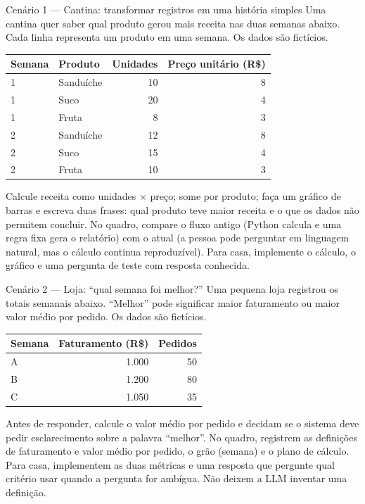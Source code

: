 \documentclass[10pt,a4paper]{article}
\begin{document}
\begin{cenario}{Cenário 1 --- Cantina: transformar registros em uma história simples}
Uma cantina quer saber qual produto gerou mais receita nas duas semanas abaixo. Cada linha representa um produto em uma semana. Os dados são fictícios.

\begin{center}\small
\begin{tabular}{l l r r}\toprule
Semana & Produto & Unidades & Preço unitário (R\$) \\\midrule
1 & Sanduíche & 10 & 8 \\
1 & Suco & 20 & 4 \\
1 & Fruta & 8 & 3 \\
2 & Sanduíche & 12 & 8 \\
2 & Suco & 15 & 4 \\
2 & Fruta & 10 & 3 \\\bottomrule
\end{tabular}
\end{center}
\end{cenario}
\begin{pedido}
Calcule receita como unidades $\times$ preço; some por produto; faça um gráfico de barras e escreva duas frases: qual produto teve maior receita e o que os dados não permitem concluir. No quadro, compare o fluxo antigo (Python calcula e uma regra fixa gera o relatório) com o atual (a pessoa pode perguntar em linguagem natural, mas o cálculo continua reproduzível). Para casa, implemente o cálculo, o gráfico e uma pergunta de teste com resposta conhecida.
\end{pedido}

\begin{cenario}{Cenário 2 --- Loja: ``qual semana foi melhor?''}
Uma pequena loja registrou os totais semanais abaixo. ``Melhor'' pode significar maior faturamento ou maior valor médio por pedido. Os dados são fictícios.

\begin{center}\small
\begin{tabular}{l r r}\toprule
Semana & Faturamento (R\$) & Pedidos \\\midrule
A & 1.000 & 50 \\
B & 1.200 & 80 \\
C & 1.050 & 35 \\\bottomrule
\end{tabular}
\end{center}
\end{cenario}
\begin{pedido}
Antes de responder, calcule o valor médio por pedido e decidam se o sistema deve pedir esclarecimento sobre a palavra ``melhor''. No quadro, registrem as definições de faturamento e valor médio por pedido, o grão (semana) e o plano de cálculo. Para casa, implementem as duas métricas e uma resposta que pergunte qual critério usar quando a pergunta for ambígua. Não deixem a LLM inventar uma definição.
\end{pedido}
\end{document}
